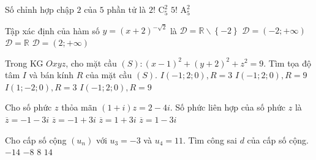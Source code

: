 \begin{ex}%
	Số chỉnh hợp chập $2$ của $5$ phần tử là
	\choice
	{$2!$}
	{$\mathrm{C}_5^2$}
	{$5!$}
	{\True $\mathrm{A}_5^2$}
\end{ex}
\begin{ex}%
	Tập xác định của hàm số $y=\left( x+2 \right)^{-\sqrt{2}}$ là
	\choice
	{$\mathscr{D}=\mathbb{R}\backslash \left\{ -2 \right\}$}
	{\True $\mathscr{D}=\left( -2;+\infty \right)$}
	{$\mathscr{D}=\mathbb{R}$}
	{$\mathscr{D}=\left( 2;+\infty \right)$}
\end{ex}
\begin{ex}%
	Trong KG $Oxyz$, cho mặt cầu $\left( S \right) \colon \left( x-1 \right)^2+\left( y+2 \right)^2+z^2=9$. Tìm tọa độ tâm $I$ và bán kính $R$ của mặt cầu $\left( S \right)$.
	\choice
	{$I\left( -1;2;0 \right), R=3$}
	{$I\left( -1;2;0 \right), R=9$}
	{\True $I\left( 1;-2;0 \right), R=3$}
	{$I\left( -1;2;0 \right), R=9$}
\end{ex}
\begin{ex}%
	Cho số phức $z$ thỏa mãn $\left( 1+i \right)z=2-4i$. Số phức liên hợp của số phức $z$ là
	\choice
	{$\overline{z}=-1-3i$}
	{\True $\overline{z}=-1+3i$}
	{$\overline{z}=1+3i$}
	{$\overline{z}=1-3i$}
\end{ex}
\begin{ex}%
	Cho cấp số cộng $\left( u_n \right)$ với $u_3=-3$ và $u_4=11$. Tìm công sai $d$ của cấp số cộng.
	\choice
	{$-14$}
	{$-8$}
	{$8$}
	{\True $14$}
\end{ex}
